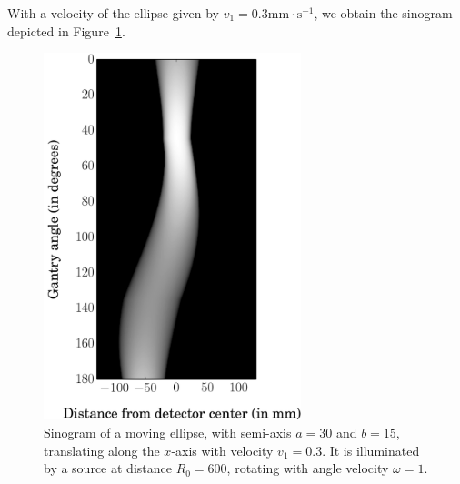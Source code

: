 \documentclass[twocolumn]{IEEEtran}
\numberwithin{equation}{section}
\begin{document}
With a velocity of the ellipse given by $v_1 = 0.3 \textrm{mm} \cdot \textrm{s}^{-1}$, we obtain the sinogram depicted in Figure~\ref{fig:sinogram}.
\begin{figure}[!ht]
	\centering
	\includegraphics[width=75mm]{figs/sinogram.png}
	\caption{Sinogram of a moving ellipse, with semi-axis $a = 30$ and $b = 15$, translating along the $x$-axis with velocity $v_1 = 0.3$. It is illuminated by a source at distance $R_0 = 600$, rotating with angle velocity $\omega = 1$.\label{fig:sinogram}}
\end{figure}
\end{document}
